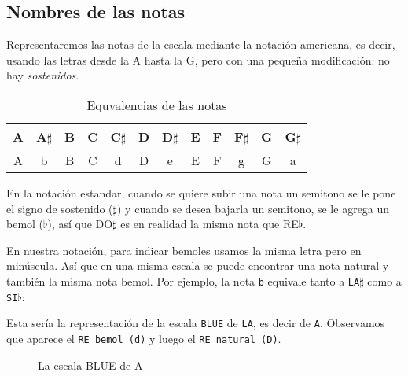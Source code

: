 \documentclass[]{article}
\begin{document}
\subsection{Nombres de las notas}

Representaremos las notas de la escala mediante la notación americana, es decir, usando las letras desde la A hasta la G, pero con una pequeña modificación: no hay \emph{sostenidos}.

\begin{table}[htbp]
  \centering
  \begin{tabular}{*{12}{c}}
    \toprule
    A & A$\sharp$ & B & C & C$\sharp$ & D & D$\sharp$ & E & F & F$\sharp$ & G & G$\sharp$ \\
    \midrule    
    A & b & B & C & d & D & e & E & F & g & G & a  \\    
    \bottomrule
  \end{tabular}
  \caption{Equvalencias de las notas}
  \label{tab:note-equivalences}
\end{table}

En la notación estandar, cuando se quiere subir una nota un semitono se le pone el signo de sostenido ($\sharp$) y cuando se desea bajarla un semitono, se le agrega un bemol ($\flat$), así que DO$\sharp$ es en realidad la misma nota que RE$\flat$.

En nuestra notación, para indicar bemoles usamos la misma letra pero en minúscula. Así que en una misma escala se puede encontrar una nota natural y también la misma nota bemol. Por ejemplo, la nota \texttt{b} equivale tanto a \texttt{LA$\sharp$} como a \texttt{SI$\flat$}: 

Esta sería la representación de la escala \texttt{BLUE} de \texttt{LA}, es decir de \texttt{A}. Observamos que aparece el \texttt{RE\ bemol\ (d)} y luego el \texttt{RE\ natural\ (D)}.
\begin{figure}
 \center

  \vspace{12pt}

\caption{La escala BLUE de A}
\label{fig:blue-scale-of-a}
\end{figure}
\end{document}
